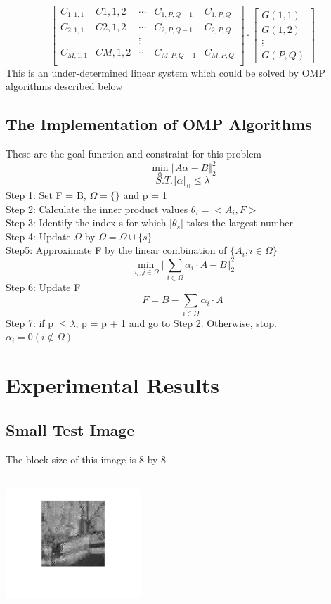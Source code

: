\documentclass{article}
\begin{document}
$$
\begin{bmatrix}
C_{1,1,1} & C{1,1,2} & \cdots & C_{1,P,Q-1} & C_{1,P,Q}\\
C_{2,1,1} & C{2,1,2} & \cdots & C_{2,P,Q-1} & C_{2,P,Q}\\
&&\vdots\\
C_{M,1,1} & C{M,1,2} & \cdots & C_{M,P,Q-1} & C_{M,P,Q}\\
\end{bmatrix}
\cdot
\begin{bmatrix}
G(1,1)\\
G(1,2)\\
\vdots\\
G(P,Q)
\end{bmatrix}
$$
This is an under-determined linear system which could be solved by OMP algorithms described below
\subsection{The Implementation of OMP Algorithms}
These are the goal function and constraint for this problem
$$
\min_\alpha \Vert A \alpha - B\Vert^2_2
$$
$$
S.T. \Vert \alpha \Vert_0 \leq \lambda
$$
Step 1: Set F = B, $ \Omega = \{\} $ and p = 1
$$
$$
Step 2: Calculate the inner product values $ \theta_i = <A_i, F> $
$$
$$
Step 3: Identify the index s for which $ \vert \theta_s\vert $ takes the largest number
$$
$$
Step 4: Update $\Omega $ by $\Omega = \Omega \cup \{s\}$
$$
$$
Step5: Approximate F by the linear combination of $ \{ A_i, i \in \Omega \} $
$$
$$
$$\min_{a_i,j \in \Omega} \Vert \sum_{i\in\Omega }\alpha_i \cdot A - B \Vert_2^2$$
$$
$$
Step 6: Update F
$$
$$
$$F = B - \sum_{i \in \Omega}\alpha_i \cdot A$$
$$
$$
Step 7: if p $\le \lambda$, p = p + 1 and go to Step 2. Otherwise, stop.
$$
$$
$\alpha_i = 0 (i \notin \Omega)$
$$
$$
\section{Experimental Results}

\subsection{Small Test Image}

The block size of this image is 8 by 8


\includegraphics[width=2in,height=2in]{1-10.png}
\vspace{-0.5in}
\end{document}
